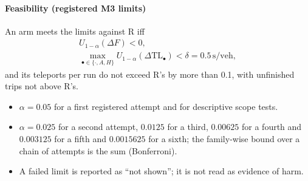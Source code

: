 \paragraph{Feasibility (registered M3 limits)} An arm meets the limits against R iff
\begin{gather}
U_{1-\alpha}(\Delta F)<0,\\
\max_{\bullet\in\{\cdot,A,H\}}U_{1-\alpha}(\Delta\mathrm{TL}_\bullet)<\delta=0.5\,\mathrm{s/veh},
\end{gather}
and its teleports per run do not exceed R's by more than 0.1, with unfinished trips not above R's.
\begin{itemize}\setlength\itemsep{0pt}
\item $\alpha=0.05$ for a first registered attempt and for descriptive scope tests.
\item $\alpha=0.025$ for a second attempt, $0.0125$ for a third, $0.00625$ for a fourth and $0.003125$ for a fifth and $0.0015625$ for a sixth; the family-wise bound over a chain of attempts is the sum (Bonferroni).
\item A failed limit is reported as ``not shown''; it is not read as evidence of harm.
\end{itemize}

